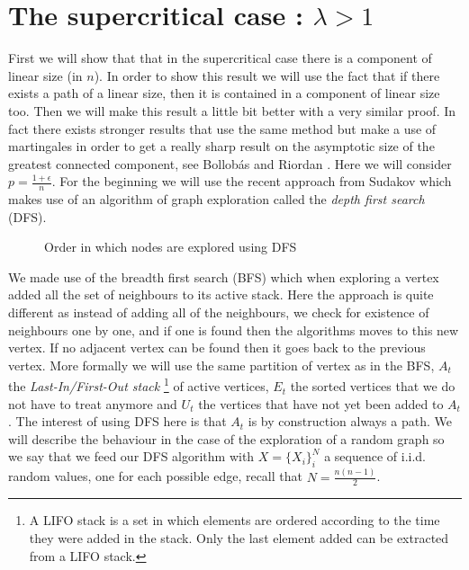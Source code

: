 \section{The supercritical case : $\lambda > 1 $ }
First we will show that that in the supercritical case there is a component of linear size (in $n$). In order to show this result we will use the fact that if there exists a path of a linear size, then it is contained in a component of linear size too. Then we will make this result a little bit better with a very similar proof.
\newline
In fact there exists stronger results that use the same method but make a use of martingales in order to get a really sharp result on the asymptotic size of the greatest connected component, see Bollob\'as and Riordan \cite{BollobRiordan12}.
\newline
Here we will consider $p = \frac{1 + \epsilon}{n}$. 
For the beginning we will use the recent approach from Sudakov \cite{Sudakov} which makes use of an algorithm of graph exploration called the \emph{depth first search} (DFS).
\begin{figure}
    \centering
    \caption{Order in which nodes are explored using DFS}
    \label{fig:DFS}
\end{figure}
We made use of the breadth first search (BFS) which when exploring a vertex added all the set of neighbours to its active stack.
Here the approach is quite different as instead of adding all of the neighbours, we check for existence of neighbours one by one, and if one is found then the algorithms moves to this new vertex. If no adjacent vertex can be found then it goes back to the previous vertex.
\newline
More formally we will use the same partition of vertex as in the BFS, $A_t$ the \emph{Last-In/First-Out stack}
\footnote{A LIFO stack is a set in which elements are ordered according to the time they were added in the stack. 
Only the last element added can be extracted from a LIFO stack.}
of active vertices, $E_t$ the sorted vertices that we do not have to treat anymore and $U_t$ the vertices that have not yet been added to $A_t$.
The interest of using DFS here is that $A_t$ is by construction always a path.
\newline
We will describe the behaviour in the case of the exploration of a random graph so we say that we feed our DFS algorithm with $X = \{X_i\}_i^N$ a sequence of i.i.d. random values, one for each possible edge, recall that $N = \frac{n(n-1)}{2}$.
